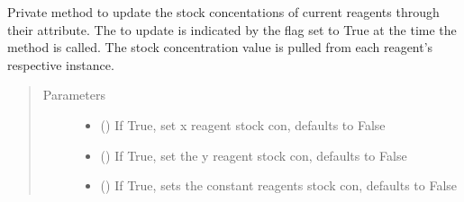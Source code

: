 \documentclass[letterpaper,10pt,english]{sphinxmanual}
\begin{document}
\begin{fulllineitems}
\begin{fulllineitems}
\end{fulllineitems}


\begin{fulllineitems}
\label{\detokenize{polo.widgets:polo.widgets.optimize_widget.OptimizeWidget._set_reagent_stock_con_values}}
Private method to update the stock concentations of current
reagents through their 
attribute. The  to update
is indicated by the flag set to True at the time the method is
called. The stock concentration value is pulled from each reagent’s
respective  instance.
\begin{quote}\begin{description}
\item[{Parameters}] \leavevmode\begin{itemize}
\item {} 
 (\sphinxstyleliteralemphasis{\sphinxupquote{, }}) \textendash{} If True, set x reagent stock con, defaults to False

\item {} 
 (\sphinxstyleliteralemphasis{\sphinxupquote{, }}) \textendash{} If True, set the y reagent stock con, defaults to False

\item {} 
 (\sphinxstyleliteralemphasis{\sphinxupquote{, }}) \textendash{} If True, sets the constant reagents stock con,
defaults to False

\end{itemize}


\end{description}
\end{quote}
\end{fulllineitems}
\end{fulllineitems}
\end{document}
